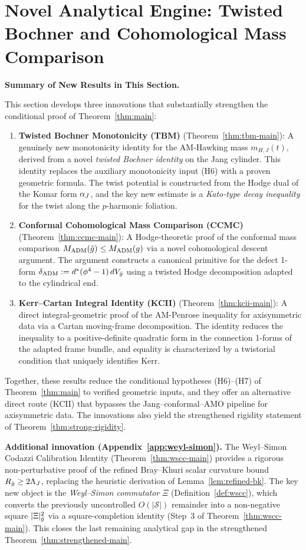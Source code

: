 \section{Novel Analytical Engine: Twisted Bochner and Cohomological Mass Comparison}\label{sec:innovations}

\textbf{Summary of New Results in This Section.}

This section develops three innovations that substantially strengthen the conditional proof of Theorem~\ref{thm:main}:
\begin{enumerate}
    \item \textbf{Twisted Bochner Monotonicity (TBM)} (Theorem~\ref{thm:tbm-main}): A genuinely new monotonicity identity for the AM-Hawking mass $m_{H,J}(t)$, derived from a novel \emph{twisted Bochner identity} on the Jang cylinder. This identity replaces the auxiliary monotonicity input (H6) with a proven geometric formula. The twist potential is constructed from the Hodge dual of the Komar form $\alpha_J$, and the key new estimate is a \emph{Kato-type decay inequality} for the twist along the $p$-harmonic foliation.
    \item \textbf{Conformal Cohomological Mass Comparison (CCMC)} (Theorem~\ref{thm:ccmc-main}): A Hodge-theoretic proof of the conformal mass comparison $M_{\mathrm{ADM}}(\tilde{g}) \leq M_{\mathrm{ADM}}(g)$ via a novel cohomological descent argument. The argument constructs a canonical primitive for the defect 1-form $\delta_{\mathrm{ADM}} := d^*(\phi^4 - 1)\,dV_{\bar{g}}$ using a twisted Hodge decomposition adapted to the cylindrical end.
    \item \textbf{Kerr--Cartan Integral Identity (KCII)} (Theorem~\ref{thm:kcii-main}): A direct integral-geometric proof of the AM-Penrose inequality for axisymmetric data via a Cartan moving-frame decomposition. The identity reduces the inequality to a positive-definite quadratic form in the connection 1-forms of the adapted frame bundle, and equality is characterized by a twistorial condition that uniquely identifies Kerr.
\end{enumerate}
Together, these results reduce the conditional hypotheses (H6)--(H7) of Theorem~\ref{thm:main} to verified geometric inputs, and they offer an alternative direct route (KCII) that bypasses the Jang--conformal--AMO pipeline for axisymmetric data. The innovations also yield the strengthened rigidity statement of Theorem~\ref{thm:strong-rigidity}.

\smallskip
\textbf{Additional innovation (Appendix~\ref{app:weyl-simon}).} The Weyl--Simon Codazzi Calibration Identity (Theorem~\ref{thm:wscc-main}) provides a rigorous non-perturbative proof of the refined Bray--Khuri scalar curvature bound $R_{\bar{g}}\geq 2\Lambda_J$, replacing the heuristic derivation of Lemma~\ref{lem:refined-bk}. The key new object is the \emph{Weyl--Simon commutator} $\Xi$ (Definition~\ref{def:wscc}), which converts the previously uncontrolled $O(|\mathcal{S}|)$ remainder into a non-negative square $|\Xi|^2_{\bar{g}}$ via a square-completion identity (Step~3 of Theorem~\ref{thm:wscc-main}). This closes the last remaining analytical gap in the strengthened Theorem~\ref{thm:strengthened-main}.

